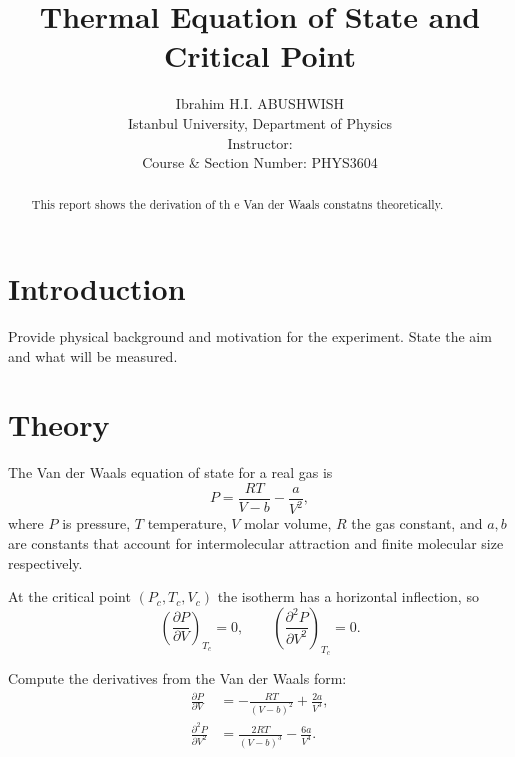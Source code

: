 \documentclass[journal]{IEEEtran}
\begin{document}
\title{Thermal Equation of State and Critical Point}
\author{Ibrahim H.I. ABUSHWISH \\
Istanbul University, Department of Physics \\
Instructor: \\
Course \& Section Number: PHYS3604}

\maketitle

\begin{abstract}
    This report shows the derivation of th e Van der Waals constatns theoretically.
\end{abstract}

\section{Introduction}
Provide physical background and motivation for the experiment. State the aim and what will be measured.

\section{Theory}
The Van der Waals equation of state for a real gas is
\begin{equation}
P = \frac{RT}{V - b} - \frac{a}{V^2},
\label{eq:vdw}
\end{equation}
where $P$ is pressure, $T$ temperature, $V$ molar volume, $R$ the gas constant, and $a,b$ are constants that account for intermolecular attraction and finite molecular size respectively.

At the critical point $(P_c,T_c,V_c)$ the isotherm has a horizontal inflection, so
\begin{equation}
\left(\frac{\partial P}{\partial V}\right)_{T_c}=0,\qquad
\left(\frac{\partial^2 P}{\partial V^2}\right)_{T_c}=0.
\label{eq:critconds}
\end{equation}

Compute the derivatives from the Van der Waals form:
\begin{align}
\frac{\partial P}{\partial V} &= -\frac{RT}{(V-b)^2} + \frac{2a}{V^3},\\
\frac{\partial^2 P}{\partial V^2} &= \frac{2RT}{(V-b)^3} - \frac{6a}{V^4}.
\end{align}
\end{document}
